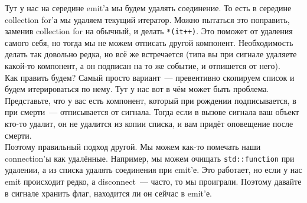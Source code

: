 \documentclass{article}
\begin{document}
    Тут у нас на середине emit'а мы будем удалять соединение. То есть в середине collection for'а мы удаляем текущий итератор. Можно пытаться это поправить, заменив collection for на обычный, и делать \texttt{*(it++)}. Это поможет от удаления самого себя, но тогда мы не можем отписать другой компонент. Необходимость делать так довольно редка, но всё же встречается (типа вы при сигнале удаляете какой-то компонент, а он подписан на то же событие, и отпишется от него).\\
    Как править будем? Самый просто вариант~--- превентивно скопируем список и будем итерироваться по нему. Тут у нас вот в чём может быть проблема. Представьте, что у вас есть компонент, который при рождении подписывается, в при смерти~--- отписывается от сигнала. Тогда если в вызове сигнала ваш объект кто-то удалит, он не удалится из копии списка, и вам придёт оповещение после смерти.\\
    Поэтому правильный подход другой. Мы можем как-то помечать наши connection'ы как удалённые. Например, мы можем очищать \texttt{std::function} при удалении, а из списка удалять соединения при emit'е. Это работает, но если у нас emit происходит редко, а disconnect~--- часто, то мы проиграли. Поэтому давайте в сигнале хранить флаг, находится ли он сейчас в emit'е.
\end{document}
